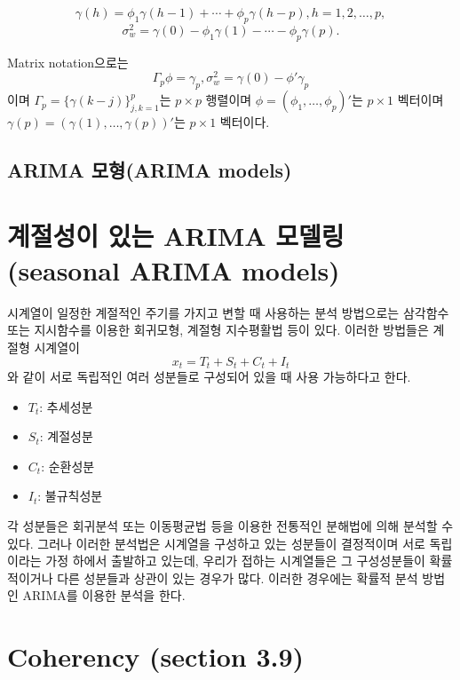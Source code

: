 \documentclass[b5paper,]{scrbook}
\theoremstyle{plain}
\theoremstyle{definition}
\numberwithin{equation}{section}
\let\BeginKnitrBlock\begin \let\EndKnitrBlock\end
\begin{document}
\BeginKnitrBlock{definition}[Yule-Walker equations]
\protect\hypertarget{def:unnamed-chunk-226}{}{\label{def:unnamed-chunk-226} {} }\[\gamma(h)=\phi_{1}\gamma(h-1)+\cdots +\phi_{p}\gamma(h-p), h=1,2,\ldots, p, \]
\[\sigma_{w}^{2}=\gamma(0)-\phi_{1}\gamma(1)-\cdots - \phi_{p}\gamma(p).\]

Matrix notation으로는
\[\Gamma_{p}\phi=\gamma_{p}, \sigma_{w}^{2}=\gamma(0)-\phi'\gamma_{p}\]
이며 \(\Gamma_{p}=\{ \gamma (k-j) \}_{j,k=1}^{p}\)는 \(p\times p\) 행렬이며 \(\phi=(\phi_{1},\ldots , \phi_{p})'\)는 \(p\times 1\) 벡터이며 \(\gamma(p)=(\gamma(1),\ldots ,\gamma(p))'\)는 \(p\times 1\) 벡터이다.
\EndKnitrBlock{definition}

\hypertarget{arima-arima-models}{%
\subsection{ARIMA 모형(ARIMA models)}\label{arima-arima-models}}

\hypertarget{--arima-seasonal-arima-models}{%
\section{계절성이 있는 ARIMA 모델링(seasonal ARIMA models)}\label{--arima-seasonal-arima-models}}

시계열이 일정한 계절적인 주기를 가지고 변할 때 사용하는 분석 방법으로는 삼각함수 또는 지시함수를 이용한 회귀모형, 계절형 지수평활법 등이 있다. 이러한 방법들은 계절형 시계열이
\[x_{t}=T_{t}+S_{t}+C_{t}+I_{t}\]
와 같이 서로 독립적인 여러 성분들로 구성되어 있을 때 사용 가능하다고 한다.

\begin{itemize}
\item
  \(T_{t}\): 추세성분
\item
  \(S_{t}\): 계절성분
\item
  \(C_{t}\): 순환성분
\item
  \(I_{t}\): 불규칙성분
\end{itemize}

각 성분들은 회귀분석 또는 이동평균법 등을 이용한 전통적인 분해법에 의해 분석할 수 있다. 그러나 이러한 분석법은 시계열을 구성하고 있는 성분들이 결정적이며 서로 독립이라는 가정 하에서 출발하고 있는데, 우리가 접하는 시계열들은 그 구성성분들이 확률적이거나 다른 성분들과 상관이 있는 경우가 많다. 이러한 경우에는 확률적 분석 방법인 ARIMA를 이용한 분석을 한다.

\hypertarget{coherency-section-3.9}{%
\section{Coherency (section 3.9)}\label{coherency-section-3.9}}
\end{document}
